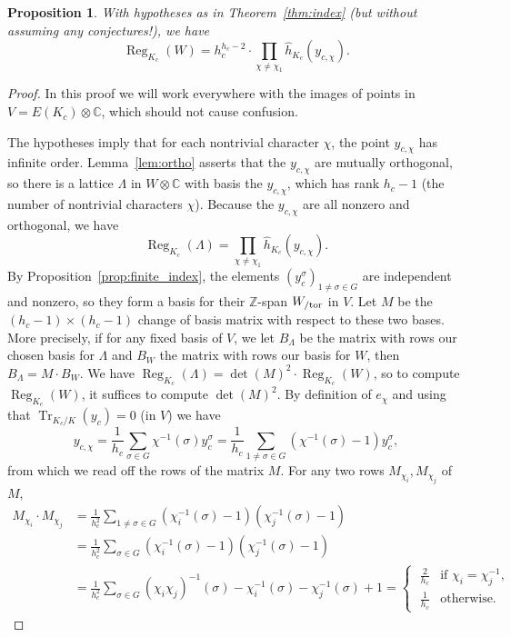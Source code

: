 \documentclass[preprint,12pt]{elsarticle}
\newcommand{\C}{\mathbb{C}}
\newcommand{\tor}{{\rm tor}}
\newcommand{\hhat}{\hat{h}}
\newcommand{\Z}{\mathbb{Z}}
\newcommand{\tensor}{\otimes}
\DeclareMathOperator{\Reg}{Reg}
\DeclareMathOperator{\Tr}{Tr}
\theoremstyle{plain}
\newtheorem{proposition}[theorem]{Proposition}
\theoremstyle{definition}
\begin{document}
\begin{proposition}\label{prop:regW}
  With hypotheses as in Theorem~\ref{thm:index} (but without assuming
  any conjectures!), we have
$$
 \Reg_{K_c}(W) = h_c^{h_c-2} \cdot \prod_{\chi \ne \chi_1} \hhat_{K_c}(y_{c,\chi}).
$$
\end{proposition}

\begin{proof} 
  In this proof we will work everywhere with the images of points in
  $V=E(K_c)\tensor \C$, which should not cause confusion.

  The hypotheses imply that for each nontrivial character $\chi$, the point $y_{c,\chi}$ has infinite
  order.  Lemma~\ref{lem:ortho} asserts that
  the $y_{c,\chi}$ are mutually orthogonal, so there is a lattice
  $\Lambda$ in $W\tensor\C$ with basis the $y_{c,\chi}$, which has
  rank $h_c-1$ (the number of nontrivial characters $\chi$).  Because
  the $y_{c,\chi}$ are all nonzero and orthogonal, we have
  $$
  \Reg_{K_c}(\Lambda) = \prod_{\chi \ne \chi_1}
  \hhat_{K_c}(y_{c,\chi}).
  $$
  By Proposition~\ref{prop:finite_index}, the elements
  $(y_{c}^\sigma)_{1 \ne \sigma \in G}$ are independent and nonzero,
  so they form a basis for their $\Z$-span $W_{/\tor}$ in $V$.  Let
  $M$ be the $(h_c-1)\times (h_c-1)$ change of basis matrix with
  respect to these two bases.  More precisely, if for any fixed basis of
  $V$, we let $B_\Lambda$ be the matrix with rows our chosen basis for
  $\Lambda$ and $B_W$ the matrix with rows our basis for $W$, then
  $B_{\Lambda} = M \cdot B_W$.  We have $\Reg_{K_c}(\Lambda) = \det(M)^2
  \cdot \Reg_{K_c}(W)$, so to compute $\Reg_{K_c}(W)$, it suffices to
  compute $\det(M)^2$.  By definition of $e_\chi$ and using that
  $\Tr_{K_c/K}(y_c) = 0$ (in $V$) we have
  $$
   y_{c,\chi} = \frac{1}{h_c} \sum_{\sigma \in G}
   \chi^{-1}(\sigma) y_c^\sigma = \frac{1}{h_c} \sum_{1 \ne \sigma \in G}
    (\chi^{-1}(\sigma) - 1)y_c^\sigma,
  $$
  from which we read off the rows of the matrix $M$.  For any two rows
  $M_{\chi_i}, M_{\chi_j}$ of $M$,
  \begin{align*}
   M_{\chi_i} \cdot M_{\chi_j} 
    &= \frac{1}{h_c^2} \sum_{1 \ne \sigma \in G} (\chi_i^{-1}(\sigma) - 1)(\chi_j^{-1}(\sigma) - 1)\\
    &= \frac{1}{h_c^2} \sum_{\sigma \in G} (\chi_i^{-1}(\sigma) - 1)(\chi_j^{-1}(\sigma) - 1) \\
    &= \frac{1}{h_c^2} \sum_{\sigma \in G} (\chi_i\chi_j)^{-1}(\sigma) - \chi_i^{-1}(\sigma) - \chi_j^{-1}(\sigma) + 1
  = \begin{cases} \; \frac{2}{h_c} & \text{if $\chi_i = \chi_j^{-1}$,} \\ \; \frac{1}{h_c} & \text{otherwise.} \end{cases}

\end{align*}
\end{proof}
\end{document}
